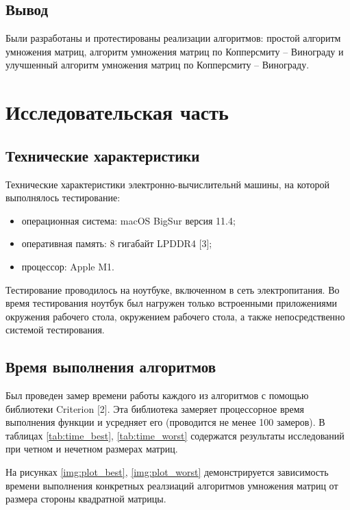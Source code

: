 \subsection{Вывод}

Были разработаны и протестированы реализации алгоритмов: простой алгоритм умножения матриц, алгоритм умножения матриц по Копперсмиту – Винограду и улучшенный алгоритм умножения матриц по Копперсмиту – Винограду.

\section{Исследовательская часть}

\subsection{Технические характеристики}

Технические характеристики электронно-вычислительнй машины, на которой выполнялось тестирование:

\begin{itemize}
    \item операционная система: macOS BigSur версия 11.4;
    \item оперативная память: 8 гигабайт LPDDR4 [3];
    \item процессор: Apple M1.
\end{itemize}


Тестирование проводилось на ноутбуке, включенном в сеть электропитания. Во время тестирования ноутбук был нагружен только встроенными приложениями окружения рабочего стола, окружением рабочего стола, а также непосредственно системой тестирования.

\subsection{Время выполнения алгоритмов}

Был проведен замер времени работы каждого из алгоритмов с помощью библиотеки Criterion [2]. Эта библиотека замеряет процессорное время выполнения функции и усредняет его (проводится не менее 100 замеров). В таблицах \ref{tab:time_best}, \ref{tab:time_worst} содержатся результаты исследований при четном и нечетном размерах матриц.

На рисунках \ref{img:plot_best}, \ref{img:plot_worst} демонстрируется зависимость времени выполнения конкретных реалзиаций алгоритмов умножения матриц от размера стороны квадратной матрицы. \\

